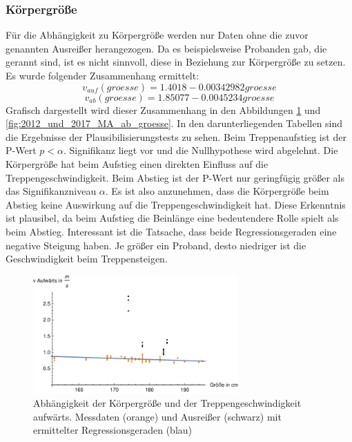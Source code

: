 \subsubsection{Körpergröße}
Für die Abhängigkeit zu Körpergröße werden nur Daten ohne die zuvor genannten Ausreißer herangezogen. Da es beispielsweise Probanden gab, die gerannt sind, ist es nicht sinnvoll, diese in Beziehung zur Körpergröße zu setzen. Es wurde folgender Zusammenhang ermittelt:
\begin{equation}
v_{auf}(groesse) = 1.4018 -0.00342982 groesse
\label{eq:2012_2017_AufGroesse_MA}
\end{equation}
\begin{equation}
v_{ab}(groesse) = 1.85077 -0.0045234 groesse
\label{eq:2012_2017_AbGroesse_MA}
\end{equation}
Grafisch dargestellt wird dieser Zusammenhang in den Abbildungen \ref{fig:2012_und_2017_MA_auf_groesse} und \ref{fig:2012_und_2017_MA_ab_groesse}. In den darunterliegenden Tabellen sind die Ergebnisse der Plausibilisierungstests zu sehen. Beim Treppenaufstieg ist der P-Wert $p<\alpha$. Signifikanz liegt vor und die Nullhypothese wird abgelehnt. Die Körpergröße hat beim Aufstieg einen direkten Einfluss auf die Treppengeschwindigkeit. Beim Abstieg ist der P-Wert nur geringfügig größer als das Signifikanzniveau $\alpha$. Es ist also anzunehmen, dass die Körpergröße beim Abstieg keine Auswirkung auf die Treppengeschwindigkeit hat. Diese Erkenntnis ist plausibel, da beim Aufstieg die Beinlänge eine bedeutendere Rolle spielt als beim Abstieg. Interessant ist die  Tatsache, dass beide Regressionsgeraden eine negative Steigung haben. Je größer ein Proband, desto niedriger ist die Geschwindigkeit beim Treppensteigen.

\begin{figure}[htpb]
	\centering
	\includegraphics[width=0.7\textwidth]{abbildungen/regression/2012_2017_verbund/ohneausreisser/auf-groesse.pdf}
	
	\caption{Abhängigkeit der Körpergröße und der Treppengeschwindigkeit aufwärts. Messdaten (orange) und Ausreißer (schwarz) mit ermittelter Regressionsgeraden (blau)}
	\label{fig:2012_und_2017_MA_auf_groesse}
\end{figure}



